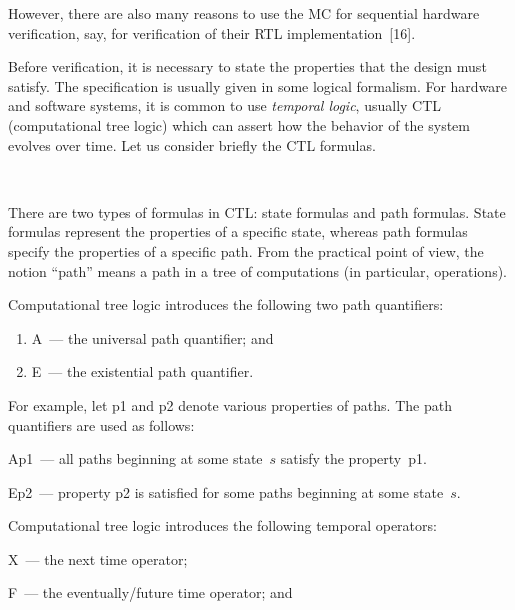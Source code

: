 \begin{multicols}{2}
   However, there are also many reasons to use the MC for sequential
hardware verification, say, for verification of
their RTL implementation~[16].

   Before verification, it is necessary to state the properties that the design must satisfy. The specification is
usually given in some logical formalism. For hardware and software systems, it is common to use
\textit{temporal logic}, usually CTL (computational tree logic) which can assert how the behavior of the system
evolves over time. Let us consider briefly the CTL formulas.

\begin{figure*} %
\vspace*{1pt}
\begin{center}
\mbox{%
\epsfxsize=109.25mm %
}
\end{center}
\vspace*{-9pt}
\end{figure*} %

   There are two types of formulas in CTL: state formulas and path formulas. State formulas represent the
properties of a specific state, whereas path formulas specify the properties of a specific path. From the practical
point of view, the notion ``path'' means a path in a tree of computations
(in particular, operations).

    Computational tree logic introduces the following two path quantifiers:
\begin{enumerate}[(1)]
 \item A~--- the universal path quantifier; and
\item  E~--- the existential path quantifier.
\end{enumerate}




   For example, let p1 and p2 denote various properties of paths. The path quantifiers are used as follows:

Ap1~--- all paths beginning at some state~$s$ satisfy the property~p1.

Ep2~--- property p2 is satisfied for some paths be\-ginning at some state~$s$.

   Computational tree logic  introduces the following   temporal operators:

 X~--- the next time operator;

 F~--- the eventually/future time operator; and


\end{multicols}
